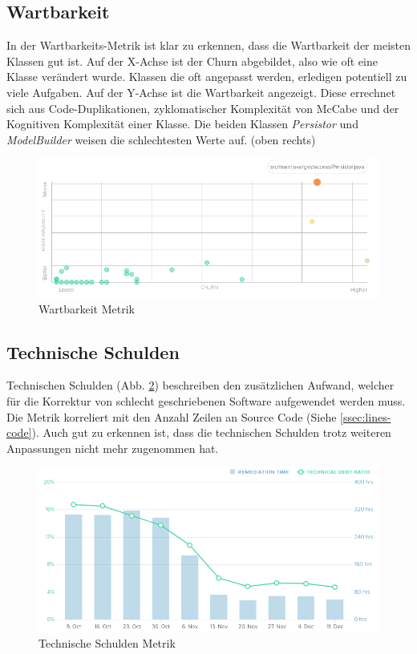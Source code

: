 \documentclass[11pt,a4paper,english,oneside]{book}
\numberwithin{equation}{chapter}
\begin{document}
	\subsection{Wartbarkeit}
	In der Wartbarkeits-Metrik \cite{metric-maintainability} ist klar zu erkennen, dass die Wartbarkeit der meisten Klassen gut ist. Auf der X-Achse ist der Churn \cite{metric-churn} abgebildet, also wie oft eine Klasse verändert wurde. Klassen die oft angepasst werden, erledigen potentiell zu viele Aufgaben. Auf der Y-Achse ist die Wartbarkeit angezeigt. Diese errechnet sich aus Code-Duplikationen, zyklomatischer Komplexität von McCabe \cite{mccabe} und der Kognitiven Komplexität \cite{metric-cognitive-complexity} einer Klasse. Die beiden Klassen \textit{Persistor} und \textit{ModelBuilder} weisen die schlechtesten Werte auf. (oben rechts)
	\begin{figure}[h!]
		\centering
		\includegraphics[width=0.7\linewidth]{assets/images/metrics/maintainability}
		\caption{Wartbarkeit Metrik}
		\label{fig:metric-maintainability}
	\end{figure}
	
	\subsection{Technische Schulden}
	Technischen Schulden (Abb. \ref{fig:metric-technical-debt}) beschreiben den zusätzlichen Aufwand, welcher für die Korrektur von schlecht geschriebenen Software aufgewendet werden muss. Die Metrik korreliert mit den Anzahl Zeilen an Source Code (Siehe \ref{ssec:lines-code}). Auch gut zu erkennen ist, dass die technischen Schulden trotz weiteren Anpassungen nicht mehr zugenommen hat.
	\begin{figure}[h!]
		\centering
		\includegraphics[width=0.7\linewidth]{assets/images/metrics/technical_debt}
		\caption{Technische Schulden Metrik}
		\label{fig:metric-technical-debt}
	\end{figure}
	
\end{document}
